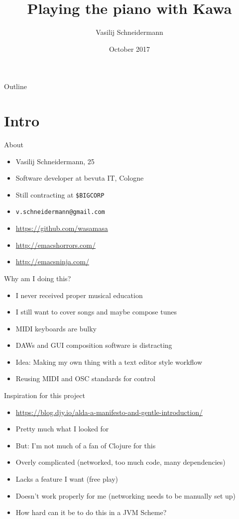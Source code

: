\documentclass[presentation]{beamer}
\author{Vasilij Schneidermann}
\date{October 2017}
\title{Playing the piano with Kawa}
\begin{document}
\maketitle
\begin{frame}{Outline}
\tableofcontents
\end{frame}

\AtBeginSection{\frame{\sectionpage}}

\section{Intro}
\label{sec-1}

\begin{frame}[fragile,label=sec-1-1]{About}
 \begin{itemize}
\item Vasilij Schneidermann, 25
\item Software developer at bevuta IT, Cologne
\item Still contracting at \texttt{\$BIGCORP}
\item \texttt{v.schneidermann@gmail.com}
\item \url{https://github.com/wasamasa}
\item \url{http://emacshorrors.com/}
\item \url{http://emacsninja.com/}
\end{itemize}
\end{frame}

\begin{frame}[label=sec-1-2]{Why am I doing this?}
\begin{itemize}
\item I never received proper musical education
\item I still want to cover songs and maybe compose tunes
\item MIDI keyboards are bulky
\item DAWs and GUI composition software is distracting
\item Idea: Making my own thing with a text editor style workflow
\item Reusing MIDI and OSC standards for control
\end{itemize}
\end{frame}

\begin{frame}[label=sec-1-3]{Inspiration for this project}
\begin{itemize}
\item \url{https://blog.djy.io/alda-a-manifesto-and-gentle-introduction/}
\item Pretty much what I looked for
\item But: I'm not much of a fan of Clojure for this
\item Overly complicated (networked, too much code, many dependencies)
\item Lacks a feature I want (free play)
\item Doesn't work properly for me (networking needs to be manually set up)
\item How hard can it be to do this in a JVM Scheme?
\end{itemize}
\end{frame}
\end{document}

